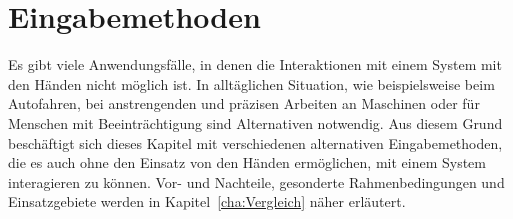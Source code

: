 \chapter{Eingabemethoden}
\label{cha:Eingabe}
Es gibt viele Anwendungsfälle, in denen die Interaktionen mit einem System mit den Händen nicht möglich ist. In alltäglichen Situation, wie beispielsweise beim Autofahren, bei anstrengenden und präzisen Arbeiten an Maschinen oder für Menschen mit Beeinträchtigung sind Alternativen notwendig. Aus diesem Grund beschäftigt sich \mbox{dieses} Kapitel mit verschiedenen alternativen Eingabemethoden, die es auch ohne den Einsatz von den Händen ermöglichen, mit einem System interagieren zu können. Vor- und Nachteile, gesonderte Rahmenbedingungen und Einsatzgebiete werden in Kapitel~\ref{cha:Vergleich} \mbox{näher} erläutert.
